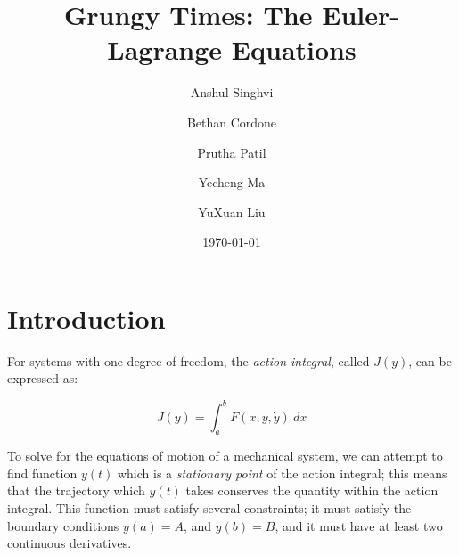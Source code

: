 \documentclass[%
 amsmath,amssymb,
aps,
 fleqn,
 notitlepage,
]{revtex4-2}
\begin{document}

\title{Grungy Times: The Euler-Lagrange Equations}

\author{Anshul Singhvi}
\author{Bethan Cordone}
\author{Prutha Patil}%
\author{Yecheng Ma}
\author{YuXuan Liu}

%

\date{\today}%

\begin{abstract}
    
\end{abstract}

\maketitle

\linespread{1.3}

\section{Introduction}

For systems with one degree of freedom, the \emph{action integral}, called $J(y)$, can be expressed as:

\begin{equation}\label{eq: action}
    J(y) = \int_a^b F(x, y, \dot y) ~ dx
\end{equation}

To solve for the equations of motion of a mechanical system, we can attempt to find function $y(t)$ which is a \emph{stationary point} of the action integral; this means that the trajectory which $y(t)$ takes conserves the quantity within the action integral.  This function must satisfy several constraints; it must satisfy the boundary conditions $y(a) = A$, and $y(b) = B$, and it must have at least two continuous derivatives.
\end{document}
